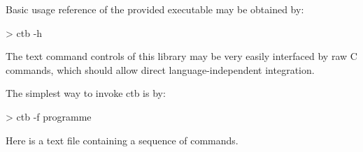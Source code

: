 Basic usage reference of the provided executable may be obtained by:
\begin{code}
> ctb -h
\end{code}


The text command controls of this library may be very easily interfaced by raw C commands, which should allow direct language-independent integration.

The simplest way to invoke ctb is by:
\begin{code}
> ctb -f programme
\end{code}

Here  is a text file containing a sequence of commands.





